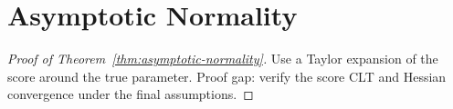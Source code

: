\section{Asymptotic Normality}\label{app:asymptotic-normality-proof}

\begin{proof}[Proof of Theorem~\ref{thm:asymptotic-normality}]
Use a Taylor expansion of the score around the true parameter. Proof gap: verify the score CLT and Hessian convergence under the final assumptions.
\end{proof}


